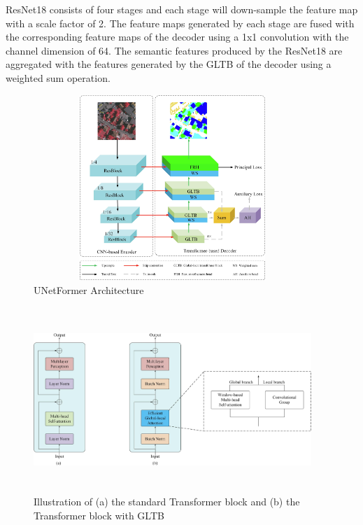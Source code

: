 ResNet18 consists of four stages and each stage will down-sample the feature map with a scale factor of 2. The feature maps generated by each stage are fused with the corresponding feature maps of the decoder using a 1x1 convolution with the channel dimension of 64. The semantic features produced by the ResNet18 are aggregated with the features generated by the GLTB of the decoder using a weighted sum operation. 

\FloatBarrier
\begin{figure}[ht]
\includegraphics[width=10.5cm, height=7cm]{images/unetformer.jpg}
\centering
\caption{UNetFormer Architecture}
\label{fig:unetformer}
\end{figure}
\begin{figure}[ht]
\includegraphics[width=10.5cm, height=7cm]{images/gltb.jpg}
\centering
\caption{ Illustration of (a) the standard Transformer block and (b) the Transformer block with GLTB}
\label{fig:gltb}
\end{figure}


